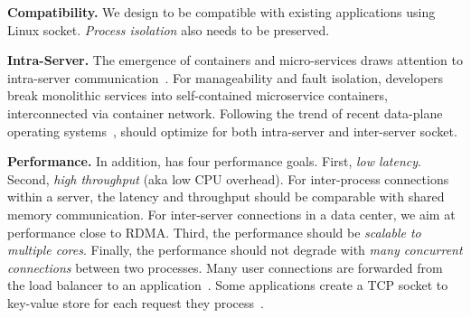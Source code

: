 




\textbf{Compatibility.}
We design \sys to be compatible with existing applications using Linux socket. \textit{Process isolation} also needs to be preserved.

\textbf{Intra-Server.}
The emergence of containers and micro-services draws attention to intra-server communication~\cite{bailis2016introducing}. For manageability and fault isolation, developers break monolithic services into self-contained microservice containers, interconnected via container network. Following the trend of recent data-plane operating systems~\cite{peter2016arrakis,belay2017ix,freeflow}, \sys should optimize for both intra-server and inter-server socket.

\textbf{Performance.}
In addition, \sys has four performance goals. First, \textit{low latency}. Second, \textit{high throughput} (aka low CPU overhead). For inter-process connections within a server, the latency and throughput should be comparable with shared memory communication. For inter-server connections in a data center, we aim at performance close to RDMA. Third, the performance should be \textit{scalable to multiple cores}. Finally, the performance should not degrade with \textit{many concurrent connections} between two processes. Many user connections are forwarded from the load balancer to an application~\cite{lin2016scalable}. Some applications create a TCP socket to key-value store for each request they process~\cite{nishtala2013scaling}.



